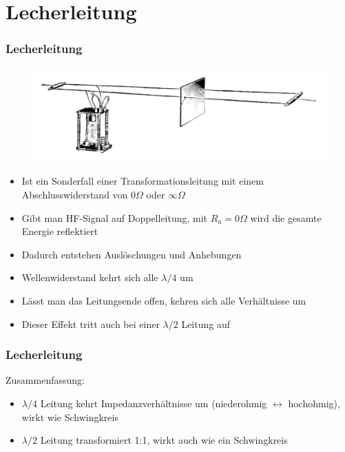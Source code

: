\section{Lecherleitung}
\begin{frame}
  \frametitle{Lecherleitung}
  \begin{center}
    \begin{figure}
      \includegraphics[width=\textwidth,height=.2\textheight,keepaspectratio]{a10/Lecher_wires_and_oscillator_1932.png}
    \end{figure}
  \end{center}
  \begin{itemize}
    \item Ist ein Sonderfall einer Transformationsleitung mit einem Abschlusswiderstand von $0 \Omega$ oder $\infty \Omega$
    \item Gibt man HF-Signal auf Doppelleitung, mit $R_a = 0 \Omega$ wird die gesamte Energie reflektiert
    \item Dadurch entstehen Auslöschungen und Anhebungen
    \item Wellenwiderstand kehrt sich alle $\lambda /4$ um
    \item Lässt man das Leitungsende offen, kehren sich alle Verhältnisse um
    \item Dieser Effekt tritt auch bei einer $\lambda /2$ Leitung auf
  \end{itemize}
\end{frame}

\begin{frame}
  \frametitle{Lecherleitung}

  Zusammenfassung:

  \begin{itemize}
    \item $\lambda /4$ Leitung kehrt Impedanzverhältnisse um (niederohmig $\leftrightarrow$ hochohmig), wirkt wie Schwingkreis
    \item $\lambda /2$ Leitung transformiert 1:1, wirkt auch wie ein Schwingkreis
  \end{itemize}

\end{frame}

